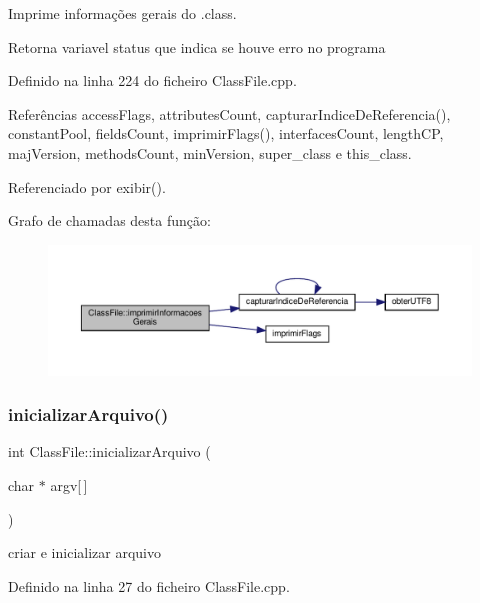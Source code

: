 Imprime informações gerais do .class. 

\begin{DoxyReturn}{Retorna}
variavel status que indica se houve erro no programa 
\end{DoxyReturn}


Definido na linha 224 do ficheiro Class\+File.\+cpp.



Referências access\+Flags, attributes\+Count, capturar\+Indice\+De\+Referencia(), constant\+Pool, fields\+Count, imprimir\+Flags(), interfaces\+Count, length\+CP, maj\+Version, methods\+Count, min\+Version, super\+\_\+class e this\+\_\+class.



Referenciado por exibir().

Grafo de chamadas desta função\+:
\nopagebreak
\begin{figure}[H]
\begin{center}
\leavevmode
\includegraphics[width=350pt]{classClassFile_a482ed64fcd8a1b79d3622b3f59b5767a_cgraph}
\end{center}
\end{figure}
\mbox{\label{classClassFile_a5fa3d7587821ed1c8e3eabb94544da29}} 
\subsubsection{\texorpdfstring{inicializar\+Arquivo()}{inicializarArquivo()}}
{\footnotesize\ttfamily int Class\+File\+::inicializar\+Arquivo (\begin{DoxyParamCaption}\item[{char $\ast$}]{argv\mbox{[}$\,$\mbox{]} }\end{DoxyParamCaption})}



criar e inicializar arquivo 



Definido na linha 27 do ficheiro Class\+File.\+cpp.




